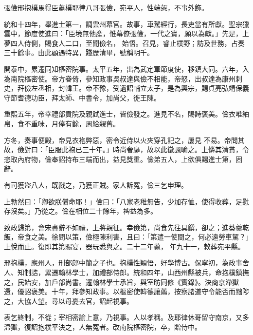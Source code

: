 
\begin{pinyinscope}

 張儉邢抱樸馬得臣蕭樸耶律八哥張儉，宛平人，性端愨，不事外飾。



 統和十四年，舉進士第一，調雲州幕官。故事，車駕經行，長吏當有所獻。聖宗獵雲中，節度使進曰：「臣境無他產，惟幕僚張儉，一代之寶，願以為獻。」先是，上夢四人侍側，賜食人二口，至聞儉名，
 始悟。召見，睿止樸野；訪及世務，占奏三十餘事。由此顧遇特異，踐歷清畢，號稱明千。



 開泰中，累遷同知樞密院事。太平五年，出為武定軍節度使，移鎮大同。六年，入為南院樞密使。帝方眷倚，參知政事吳叔達與儉不相能，帝怒，出叔達為康州刺史，拜儉左丞相，封韓王。帝不豫，受遺詔輔立太子，是為興宗，賜貞亮弘靖保義守節耆德功臣，拜太師、中書令，加尚父，徙王陳。



 重熙五年，帝幸禮部貢院及親試進士，皆儉發之。進見不名，賜詩褒美。儉衣唯紬帛，食不重味，月俸有餘，周給親舊。



 方冬，奏事便殿，帝見衣袍弊惡，密令近侍以火夾穿孔記之，屢見
 不易。帝問其故，儉對曰：「臣服此袍已三十年。」時尚奢靡，故以此徽諷喻之。上憐其清貧，令恣取內府物，儉奉詔持布三端而出，益見獎重。儉弟五人，上欲俱賜進士第，固辭。



 有司獲盜八人，既戮之，乃獲正賊。家人訴冤，儉三乞申理。



 上勃然曰：「卿欲朕償命耶！」儉曰：「八家老稚無告，少加存恤，使得收葬，足慰存沒矣。」乃從之。儉在相位二十餘年，裨益為多。



 致政歸第，會宋書辭不如禮，上將親征。幸儉第，尚食先往具饌，卻之；進葵羹乾飯，帝食之美。徐問以策，儉極陳利害，且曰：「第遣一使間之，何必遠勞車駕？」上悅而止。復即其第賜宴，器玩悉與之。二十二年薨，
 年九十一，敕葬宛平縣。



 邢抱樸，應州人，刑部郎中簡之子也。抱樸性穎悟，好學博古。保寧初，為政事舍人、知制誥，累遷翰林學士，加禮部侍郎。統和四年，山西州縣被兵，命抱樸鎮撫之，民始安，加戶部尚書。遷翰林學士承旨，與室昉同修《實錄》。決商京滯獄還，優詔褒美。十年，拜參知政事。以樞密使韓德讓薦，按察諸道守令能否而黜陟之，大協人望。尋以母憂去官，詔起視事。



 表乞終制，不從；宰相密諭上意，乃視事。人以孝稱。及耶律休哥留守南京，又多滯獄，復詔抱樸平決之，人無冤者。改南院樞密院，卒，贈侍中。




\end{pinyinscope}
